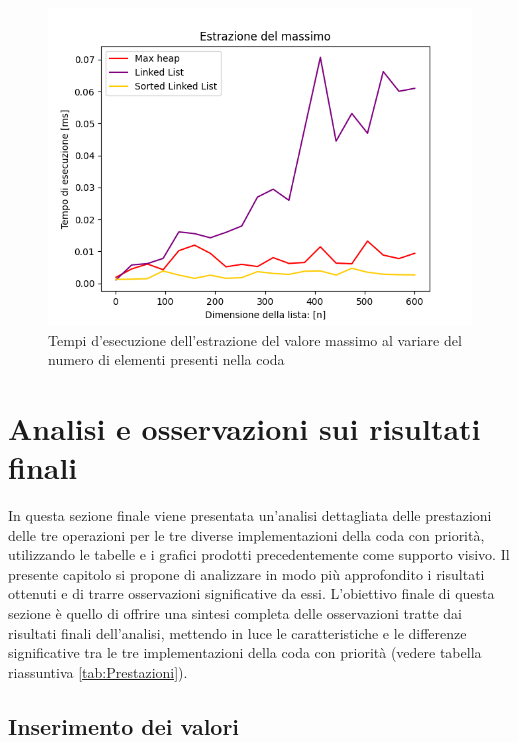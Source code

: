 \documentclass{article}
\begin{document}
\begin{figure}[h]
    \includegraphics[width=\textwidth]{Images/GraficoEstMassimo.png}
    \centering
    \caption{Tempi d'esecuzione dell'estrazione del valore massimo al variare del numero di elementi presenti nella coda}
    \label{fig:GraficoEstrazione}
\end{figure}

\clearpage

\section{Analisi e osservazioni sui risultati finali}

\label{sec:osservazioniFinali}

In questa sezione finale viene presentata un'analisi dettagliata delle prestazioni delle tre operazioni per le tre diverse implementazioni della coda con priorità, utilizzando le tabelle e i grafici prodotti precedentemente come supporto visivo. Il presente capitolo si propone di analizzare in modo più approfondito i risultati ottenuti e di trarre osservazioni significative da essi. L'obiettivo finale di questa sezione è quello di offrire una sintesi completa delle osservazioni tratte dai risultati finali dell'analisi, mettendo in luce le caratteristiche e le differenze significative tra le tre implementazioni della coda con priorità (vedere tabella riassuntiva \ref{tab:Prestazioni}).

\subsection{Inserimento dei valori}
\end{document}
